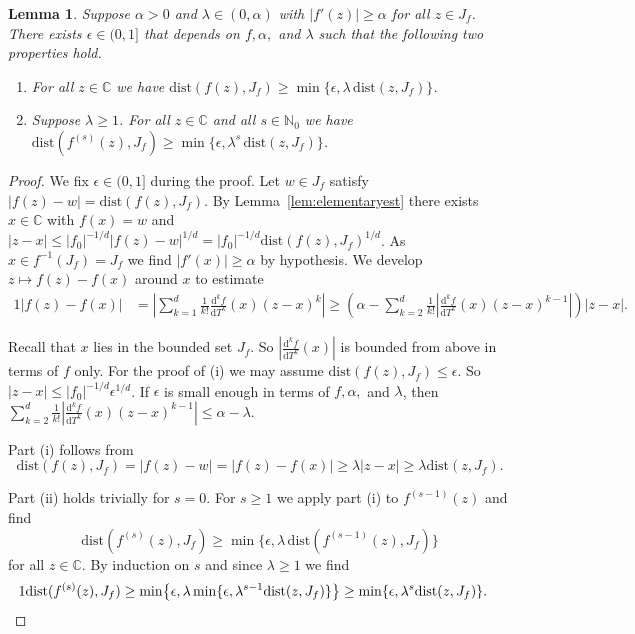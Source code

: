 \documentclass[12pt,oneside,a4]{amsart}
\newcommand{\IC}{\mathbb{C}}
\newcommand{\IN}{\mathbb{N}}
\newcounter{maincounter}
\numberwithin{maincounter}{section}
\numberwithin{equation}{section}
\newtheorem{lemma}[maincounter]{Lemma}
\begin{document}
\begin{lemma}
  \label{lem:hyperbolic}  
  Suppose $\alpha>0$ and $\lambda\in (0,\alpha)$ with $|f'(z)|\ge
  \alpha$ for all $z\in J_f$. There exists $\epsilon\in (0,1]$ that depends on
  $f,\alpha,$ and $\lambda$ such that the following two properties hold.
  \begin{enumerate}
  \item[(i)]
    For all $z\in\IC$ we have 
    $\mathrm{dist}(f(z),J_f) \ge
    \min\{\epsilon,\lambda\,
    \mathrm{dist}(z,J_f)\}$.
  \item[(ii)]
    Suppose $\lambda \ge 1$.
    For all $z\in\IC$ and all $s\in\IN_0$ we have 
    $\mathrm{dist}(f^{(s)}(z),J_f) \ge
    \min\{\epsilon,\lambda^s\,
    \mathrm{dist}(z,J_f)\}$.
  \end{enumerate}
\end{lemma}
\begin{proof}
  We fix $\epsilon\in (0,1]$ during the proof.
  Let $w\in J_f$ satisfy $|f(z)-w| = \mathrm{dist}(f(z),J_f)$.
  By Lemma~\ref{lem:elementaryest} there exists $x\in \IC$ with
  $f(x)=w$ and 
  $|z-x|\le |f_0|^{-1/d}|f(z)-w|^{1/d} = |f_0|^{-1/d}\mathrm{dist}(f(z),J_f)^{1/d}$.
  As $x\in f^{-1}(J_f)=J_f$ we find $|f'(x)|\ge\alpha$ by hypothesis.
  We develop $z\mapsto f(z)-f(x)$ around $x$   to  estimate
  \begin{alignat*}1
    |f(z)-f(x)| &= \left|\sum_{k=1}^{d}
      \frac{1}{k!}\frac{\mathrm{d}^k f}{\mathrm{d}T^k}(x) (z-x)^k \right|
    \ge  
    \left( \alpha - \sum_{k=2}^{d}
    \frac{1}{k!}\left|\frac{\mathrm{d}^k f}{\mathrm{d}T^k}(x)
    (z-x)^{k-1}\right|\right)|z-x|.
  \end{alignat*}


  Recall that $x$ lies in the bounded set $J_f$. So
  $|\frac{\mathrm{d}^k f}{\mathrm{d}T^k}(x)|$ is bounded from above in
  terms of $f$ only. 
  For the proof of (i) we may assume
  $\mathrm{dist}(f(z),J_f)\le
  \epsilon$. So $|z-x|\le |f_0|^{-1/d}\epsilon^{1/d}$.
  If $\epsilon$ is small enough in terms of $f,\alpha,$ and $\lambda$, then
  $\sum_{k=2}^{d}
  \frac{1}{k!}|\frac{\mathrm{d}^k f}{\mathrm{d}T^k}(x)
  (z-x)^{k-1}| \le \alpha-\lambda$.

  
  Part (i) follows from
  $$\mathrm{dist}(f(z),J_f) =|f(z)-w|= |f(z)-f(x)|\ge \lambda |z-x| \ge
  \lambda \mathrm{dist}(z,J_f).$$

  Part (ii) holds trivially for $s=0$. For $s\ge 1$ we  apply part (i) to
  $f^{(s-1)}(z)$ and find
  \begin{equation*}
    \mathrm{dist}(f^{(s)}(z),J_f) \ge
    \min\{\epsilon,\lambda\,\mathrm{dist}(f^{(s-1)}(z),J_f)\}
  \end{equation*}
  for all $z\in\IC$. By
  induction on $s$ and
  since $\lambda\ge 1$ we find 
  \begin{alignat*}1
    \mathrm{dist}(f^{(s)}(z),J_f) &\ge
    \min\bigl\{\epsilon,\lambda \min\{\epsilon, \lambda^{s-1}
    \mathrm{dist}(z,J_f)\}\bigr\}    
    \ge 
    \min\{\epsilon,\lambda^s \mathrm{dist}(z,J_f)\}.\qedhere
  \end{alignat*}
\end{proof}
\end{document}
